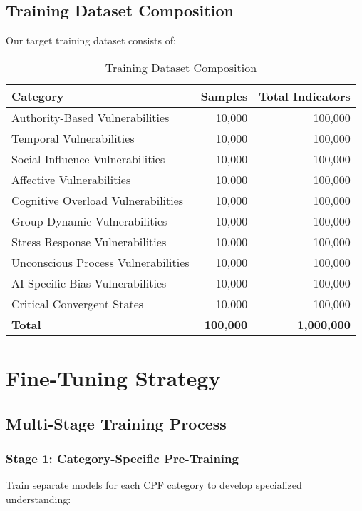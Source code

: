 \documentclass[11pt,a4paper]{article}
\begin{document}
\subsection{Training Dataset Composition}

Our target training dataset consists of:

\begin{table}[h!]
\centering
\caption{Training Dataset Composition}
\label{tab:dataset}
\begin{tabular}{lrr}
\toprule
Category & Samples & Total Indicators \\
\midrule
Authority-Based Vulnerabilities & 10,000 & 100,000 \\
Temporal Vulnerabilities & 10,000 & 100,000 \\
Social Influence Vulnerabilities & 10,000 & 100,000 \\
Affective Vulnerabilities & 10,000 & 100,000 \\
Cognitive Overload Vulnerabilities & 10,000 & 100,000 \\
Group Dynamic Vulnerabilities & 10,000 & 100,000 \\
Stress Response Vulnerabilities & 10,000 & 100,000 \\
Unconscious Process Vulnerabilities & 10,000 & 100,000 \\
AI-Specific Bias Vulnerabilities & 10,000 & 100,000 \\
Critical Convergent States & 10,000 & 100,000 \\
\midrule
\textbf{Total} & \textbf{100,000} & \textbf{1,000,000} \\
\bottomrule
\end{tabular}
\end{table}

\section{Fine-Tuning Strategy}

\subsection{Multi-Stage Training Process}

\subsubsection{Stage 1: Category-Specific Pre-Training}

Train separate models for each CPF category to develop specialized understanding:
\end{document}
